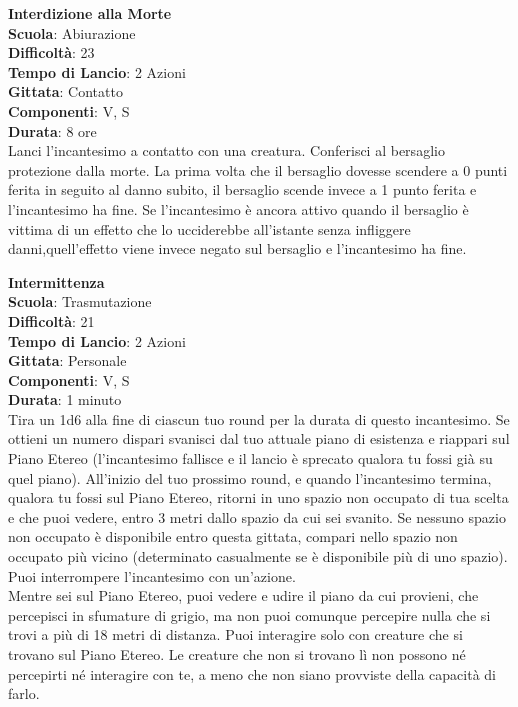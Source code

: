 \begin{multicols}{2}
\medskip\textbf{Interdizione alla Morte}\\
\textbf{Scuola}: Abiurazione\\
\textbf{Difficoltà}: 23\\
\textbf{Tempo di Lancio}: 2 Azioni\\
\textbf{Gittata}: Contatto\\
\textbf{Componenti}: V, S\\
\textbf{Durata}: 8 ore\\
Lanci l'incantesimo a contatto con una creatura. Conferisci al bersaglio protezione dalla morte. La prima volta che il bersaglio dovesse scendere a 0 punti ferita in seguito al danno subito, il bersaglio scende invece a 1 punto ferita e l'incantesimo ha fine. Se l'incantesimo è ancora attivo quando il bersaglio è vittima di un effetto che lo ucciderebbe all'istante senza infliggere danni,quell'effetto viene invece negato sul bersaglio e l'incantesimo ha fine.

\medskip\textbf{Intermittenza}\\
\textbf{Scuola}: Trasmutazione\\
\textbf{Difficoltà}: 21\\
\textbf{Tempo di Lancio}: 2 Azioni\\
\textbf{Gittata}: Personale\\
\textbf{Componenti}: V, S\\
\textbf{Durata}: 1 minuto\\
Tira un 1d6 alla fine di ciascun tuo round per la durata di questo incantesimo. Se ottieni un numero dispari svanisci dal tuo attuale piano di esistenza e riappari sul Piano Etereo (l'incantesimo fallisce e il lancio è sprecato qualora tu fossi già su quel piano). All'inizio del tuo prossimo round, e quando l'incantesimo termina, qualora tu fossi sul Piano Etereo, ritorni in uno spazio non occupato di tua scelta e che puoi vedere, entro 3 metri dallo spazio da cui sei svanito. Se nessuno spazio non occupato è disponibile entro questa gittata, compari nello spazio non occupato più vicino (determinato casualmente se è disponibile più di uno spazio). Puoi interrompere l'incantesimo con un'azione.\\
Mentre sei sul Piano Etereo, puoi vedere e udire il piano da cui provieni, che percepisci in sfumature di grigio, ma non puoi comunque percepire nulla che si trovi a più di 18 metri di distanza. Puoi interagire solo con creature che si trovano sul Piano Etereo. Le creature che non si trovano lì non possono né percepirti né interagire con te, a meno che non siano provviste della capacità di farlo.


\end{multicols}
